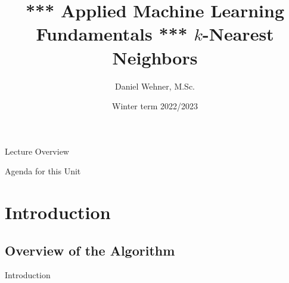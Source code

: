 


\title[$k$-Nearest Neighbors]{*** Applied Machine Learning Fundamentals *** $k$-Nearest Neighbors}
\author{Daniel Wehner, M.Sc.}
\date{Winter term 2022/2023}




\maketitlepage


\begin{frame}{Lecture Overview}{}
\end{frame}


\begin{frame}{Agenda for this Unit}
	\begin{multicols}{2}
		\tableofcontents
	\end{multicols}
\end{frame}


\section{Introduction}

\subsection{Overview of the Algorithm}

\begin{frame}{Introduction}{}
\end{frame}


